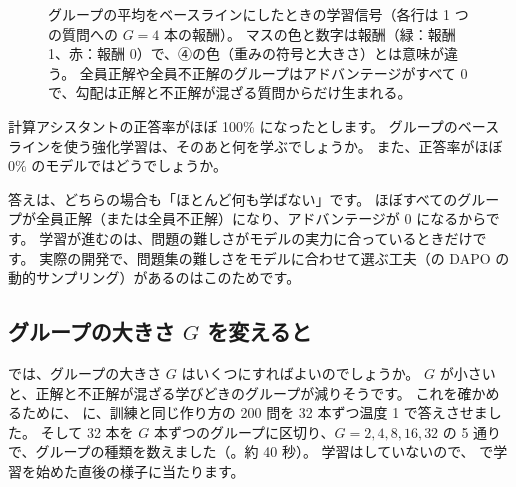 \begin{figure}[tbp]
\centering
{}
\caption{グループの平均をベースラインにしたときの学習信号（各行は 1 つの質問への $G=4$ 本の報酬）。
マスの色と数字は報酬（緑：報酬 1、赤：報酬 0）で、④の色（重みの符号と大きさ）とは意味が違う。
全員正解や全員不正解のグループはアドバンテージがすべて 0 で、勾配は正解と不正解が混ざる質問からだけ生まれる。}
\label{fig:rl-group-signal}
\end{figure}

\begin{quiz}
計算アシスタントの正答率がほぼ 100\% になったとします。
グループのベースラインを使う強化学習は、そのあと何を学ぶでしょうか。
また、正答率がほぼ 0\% のモデルではどうでしょうか。
\end{quiz}

答えは、どちらの場合も「ほとんど何も学ばない」です。
ほぼすべてのグループが全員正解（または全員不正解）になり、アドバンテージが 0 になるからです。
学習が進むのは、問題の難しさがモデルの実力に合っているときだけです。
実際の開発で、問題集の難しさをモデルに合わせて選ぶ工夫（の DAPO の動的サンプリング）があるのはこのためです。

\subsection{グループの大きさ $G$ を変えると}

では、グループの大きさ $G$ はいくつにすればよいのでしょうか。
$G$ が小さいと、正解と不正解が混ざる学びどきのグループが減りそうです。
これを確かめるために、 に、訓練と同じ作り方の 200 問を 32 本ずつ温度 1 で答えさせました。
そして 32 本を $G$ 本ずつのグループに区切り、$G=2,4,8,16,32$ の 5 通りで、グループの種類を数えました（。約 40 秒）。
学習はしていないので、 で学習を始めた直後の様子に当たります。


